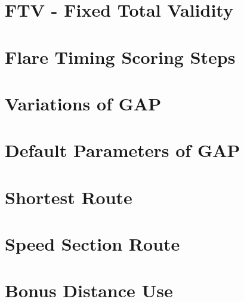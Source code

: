 \documentclass{article}
\begin{document}
\newpage
\section{FTV - Fixed Total Validity}


\newpage
\appendix
\appendixpage
\addappheadtotoc

\section{Flare Timing Scoring Steps}


\newpage
\section{Variations of GAP}


\newpage
\section{Default Parameters of GAP}


\newpage
\section{Shortest Route}


\newpage
\section{Speed Section Route}


\newpage
\section{Bonus Distance Use}

\end{document}
